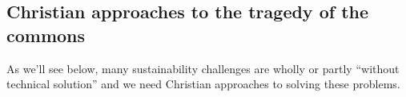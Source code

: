 \documentclass[12pt]{article}
\begin{document}
\subsection{Christian approaches to the tragedy of the commons}
\label{sec:totc}


As we'll see below, many sustainability challenges are wholly or partly ``without technical solution'' and we need
Christian approaches to solving these problems.






\printbibliography
\end{document}
